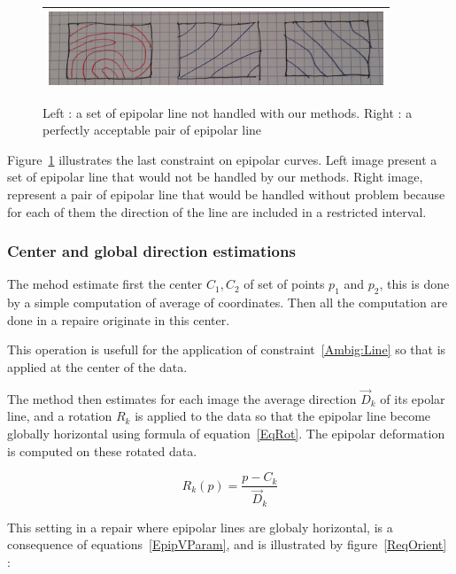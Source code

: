 \documentclass{ipol}
\begin{document}
\begin{figure}
\centering
\begin{tabular}{||c||}
 \hline \hline
\includegraphics[width=10cm]{FIGS/BadGoodLines.jpg}
 \\ \hline \hline
\end{tabular}
\caption{Left : a set of epipolar line not handled with our methods. Right : a perfectly acceptable pair  of epipolar line}
\label{BadGoodEpip}
\end{figure}

Figure~\ref{BadGoodEpip} illustrates the last constraint on epipolar curves. Left image present a set
of epipolar line that would not be handled by our methods.  Right image, represent a pair of epipolar line
that would be handled without problem because for each of them the direction of the line are included
in a restricted interval. 


\subsubsection{Center and global direction estimations}

The mehod estimate first the center $C_1,C_2$ of set of points $p_1$ and $p_2$, this is done by
a simple computation of average of coordinates.  Then all the computation are done in
a repaire originate in this center. 

This operation is usefull for the  application of constraint~\ref{Ambig:Line} so that is applied
at the center of the data.



The method then estimates for each image the average direction $\vec{D}_k$
of its epolar line, and a rotation $R_k$ is applied to the data so that the epipolar line become
globally horizontal using formula of equation~\ref{EqRot}.
The  epipolar deformation is computed on these rotated data.

\begin{equation}
    R_k(p) =  \frac{p-C_k}{\vec{D}_k}  \label{EqRot}
\end{equation}


This setting in a repair where epipolar lines are globaly horizontal, is
a consequence of equations~\ref{EpipVParam}, and is illustrated by figure~\ref{ReqOrient} :
\end{document}
